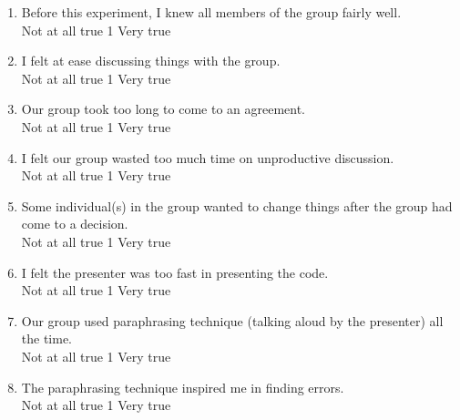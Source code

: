 \begin {enumerate}
\item Before this experiment, I knew all members of the group fairly well. 
\\
Not at all true \hfill 1     \hfill Very true\\


\item I felt at ease discussing things with the group.
\\
Not at all true \hfill 1     \hfill Very true\\


\item Our group took too long to come to an agreement.
\\
Not at all true \hfill 1     \hfill Very true\\

\item I felt our group wasted too much time on unproductive
discussion.
\\
Not at all true \hfill 1     \hfill Very true\\


\item Some individual(s) in the group wanted to change things after
the group had come to a decision.
\\
Not at all true \hfill 1     \hfill Very true\\

\item I felt the presenter was too fast in presenting the code.
\\
Not at all true \hfill 1     \hfill Very true\\

\item Our group used paraphrasing technique (talking aloud by the
presenter) all the time.
\\
Not at all true \hfill 1     \hfill Very true\\

\item The paraphrasing technique inspired me in finding errors.
\\
Not at all true \hfill 1     \hfill Very true\\



\end{enumerate}
